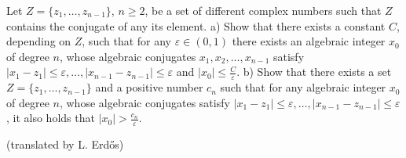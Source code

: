 Let $Z=\{ z_1,\ldots, z_{n-1}\}$, $n\ge 2$, be a set of different complex numbers such that $Z$ contains the conjugate of any its element.
a) Show that there exists a constant $C$, depending on $Z$, such that for any $\varepsilon\in (0,1)$ there exists an algebraic integer $x_0$ of degree $n$, whose algebraic conjugates $x_1, x_2, \ldots, x_{n-1}$ satisfy $|x_1-z_1|\le \varepsilon, \ldots, |x_{n-1}-z_{n-1}|\le \varepsilon$ and $|x_0|\le \frac{C}{\varepsilon}$.
b) Show that there exists a set $Z=\{ z_1, \ldots, z_{n-1}\}$ and a positive number $c_n$ such that for any algebraic integer $x_0$ of degree $n$, whose algebraic conjugates satisfy $|x_1-z_1|\le \varepsilon,\ldots, |x_{n-1}-z_{n-1}|\le \varepsilon$, it also holds that $|x_0|>\frac{c_n}{\varepsilon}$.

(translated by L. Erdős)